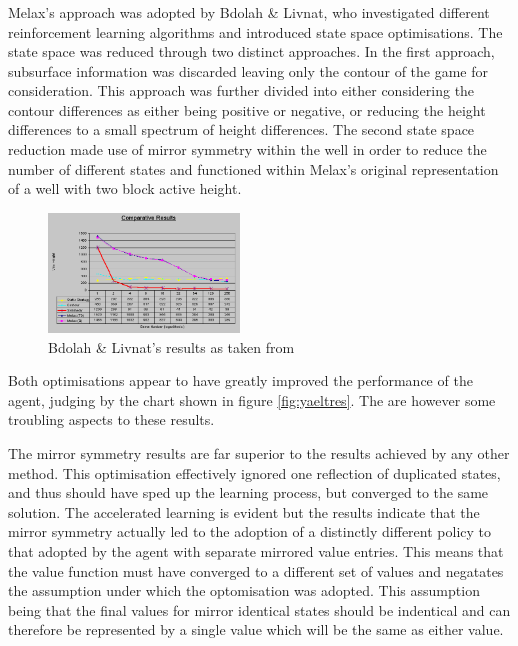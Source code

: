 \documentclass{rucsthesis}
\begin{document}
\subsubsection{\cite{yaeltetris}}

Melax's approach was adopted by Bdolah \& Livnat, who investigated different reinforcement learning algorithms and introduced state space optimisations. The state space was reduced through two distinct approaches. In the first approach, subsurface information was discarded leaving only the contour of the game for consideration. This approach was further divided into either considering the contour differences as either being positive or negative, or reducing the height differences to a small spectrum of height differences. The second state space reduction made use of mirror symmetry within the well in order to reduce the number of different states and functioned within Melax's original representation of a well with two block active height.

\begin{figure}[h]
\centering
\includegraphics[width=2in]{results.png}
\caption{Bdolah \& Livnat's results as taken from \cite{yaeltetris}}
\label{fig:yaelres}
\end{figure}

Both optimisations appear to have greatly improved the performance of the agent, judging by the chart shown in figure \ref{fig:yaeltres}. The are however some troubling aspects to these results.

The mirror symmetry results are far superior to the results achieved by any other method. This optimisation effectively ignored one reflection of duplicated states, and thus should have sped up the learning process, but converged to the same solution. The accelerated learning is evident but the results indicate that the mirror symmetry actually led to the adoption of a distinctly different policy to that adopted by the agent with separate mirrored value entries. This means that the value function must have converged to a different set of values and negatates the assumption under which the  optomisation was adopted. This assumption being that the final values for mirror identical states should be indentical and can therefore be represented by a single value which will be the same as either value. 
\end{document}

